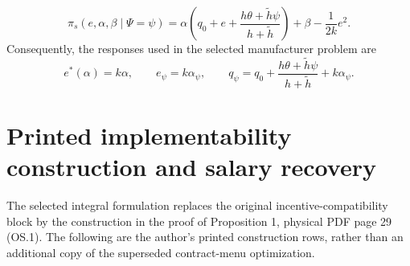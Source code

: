 \documentclass{article}
\begin{document}
\begin{equation}
\pi_s(e,\alpha,\beta\mid\Psi=\psi)
=\alpha\left(q_0+e+\frac{h\theta+\widetilde h\psi}{h+\widetilde h}\right)
+\beta-\frac{1}{2k}e^2.
\tag{1}
\end{equation}
Consequently, the responses used in the selected manufacturer problem are
\[
e^*(\alpha)=k\alpha,
\qquad e_\psi=k\alpha_\psi,
\qquad q_\psi=q_0+\frac{h\theta+\widetilde h\psi}{h+\widetilde h}+k\alpha_\psi.
\]

\section*{Printed implementability construction and salary recovery}

The selected integral formulation replaces the original incentive-compatibility block by the construction in the proof of Proposition 1, physical PDF page 29 (OS.1). The following are the author's printed construction rows, rather than an additional copy of the superseded contract-menu optimization.
\end{document}
